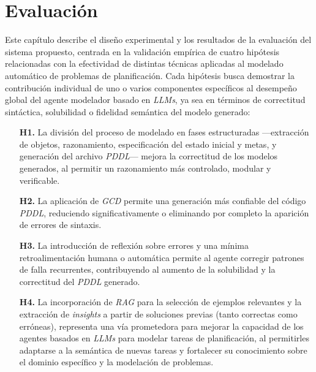 \chapter{Evaluación}\label{chapter:evaluation}

Este capítulo describe el diseño experimental y los resultados de la evaluación del sistema propuesto, centrada en la validación empírica de cuatro hipótesis relacionadas con la efectividad de distintas técnicas aplicadas al modelado automático de problemas de planificación. Cada hipótesis busca demostrar la contribución individual de uno o varios componentes específicos al desempeño global del agente modelador basado en \textit{LLMs}, ya sea en términos de correctitud sintáctica, solubilidad o fidelidad semántica del modelo generado:

\begin{itemize}
    \item[\textbf{H1.}] La división del proceso de modelado en fases estructuradas —extracción de objetos, razonamiento, especificación del estado inicial y metas, y generación del archivo \textit{PDDL}— mejora la correctitud de los modelos generados, al permitir un razonamiento más controlado, modular y verificable.
    \item[\textbf{H2.}] La aplicación de \textit{GCD}  permite una generación más confiable del código \textit{PDDL}, reduciendo significativamente o eliminando por completo la aparición de errores de sintaxis.
    \item[\textbf{H3.}] La introducción de reflexión sobre errores y una mínima retroalimentación humana o automática permite al agente corregir patrones de falla recurrentes, contribuyendo al aumento de la solubilidad y la correctitud del \textit{PDDL} generado.
    \item[\textbf{H4.}] La incorporación de \textit{RAG} para la selección de ejemplos relevantes y la extracción de \textit{insights} a partir de soluciones previas (tanto correctas como erróneas), representa una vía prometedora para mejorar la capacidad de los agentes basados en \textit{LLMs} para modelar tareas de planificación, al permitirles adaptarse a la semántica de nuevas tareas y fortalecer su conocimiento sobre el dominio específico y la modelación de problemas.
\end{itemize}

